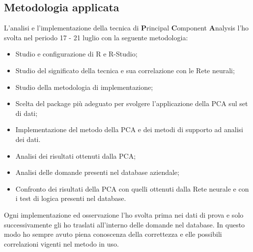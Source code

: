 \subsection{Metodologia applicata}
\label{Metodologia applicata}
L'analisi e l'implementazione della tecnica di \textbf{P}rincipal \textbf{C}omponent \textbf{A}nalysis l'ho svolta nel periodo 17 - 21 luglio con la seguente metodologia:
\begin{itemize}
\item Studio e configurazione di R e R-Studio;
\item Studio del significato della tecnica e sua correlazione con le Rete neurali;
\item Studio della metodologia di implementazione;
\item Scelta del package pi\`u adeguato per svolgere l'applicazione della PCA sul set di dati;
\item Implementazione del metodo della PCA  e dei metodi di supporto ad analisi dei dati.
\item Analisi dei risultati ottenuti dalla PCA;
\item Analisi delle domande presenti nel database aziendale;
\item Confronto dei risultati della PCA con quelli ottenuti dalla Rete neurale e con i test di logica presenti nel database.
\end{itemize}
\noindent
Ogni implementazione ed osservazione l'ho svolta prima nei dati di prova e solo successivamente gli ho traslati all'interno delle domande nel database. In questo modo ho sempre avuto piena conoscenza della correttezza e elle possibili correlazioni vigenti nel metodo in uso.

